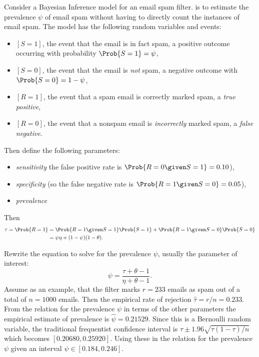 \documentclass[12pt]{article}
\begin{document}
Consider a Bayesian Inference model for an email spam filter.%
is to estimate the prevalence \( \psi \) of email spam without having to
directly count the instances of email spam.  The model has the following
random variables and events:
\begin{itemize}
    \item
        \( [S=1] \), the event that the email is in fact spam, a
        positive outcome occurring with probability \( \Prob{S=1} = \psi
        \),
    \item
        \( [S=0] \), the event that the email is \emph{not} spam, a
        negative outcome with \( \Prob{S = 0} = 1 - \psi \),
    \item
        \( [R=1] \), the event that a spam email is correctly marked
        spam, a \emph{true positive},
    \item
        \( [R=0] \), the event that a nonspam email is \emph{incorrectly}
        marked spam, a \emph{false negative}.
\end{itemize}
Then define the following parameters:
\begin{itemize}
    \item
        \emph{sensitivity}%
        the false positive rate is \( \Prob{R = 0 \given S =1} = 0.10 \)),
    \item
        \emph{specificity}%
        (so the false negative rate is \( \Prob{R = 1 \given S = 0} =
        0.05 \)),
    \item
        \emph{prevalence}%
\end{itemize}
Then
\begin{align*}
    \tau = \Prob{R = 1} &= \Prob{R = 1 \given S =1} \Prob{S = 1} + \Prob
    {R = 1 \given S =0} \Prob{S = 0} \\
    &= \psi \eta + (1 - \psi)(1-\theta).
\end{align*}

Rewrite the equation to solve for the prevalence \( \psi \), usually the
parameter of interest:
\[
    \psi = \frac{\tau + \theta - 1}{\eta + \theta -1}.
\] Assume as an example, that the filter marks \( r = 233 \) emails as
spam out of a total of \( n = 1000 \) emails.  Then the empirical rate
of rejection \( \hat{\tau} = r/n = 0.233 \).  From the relation for the
prevalence \( \psi \) in terms of the other parameters the empirical
estimate of prevalence is \( \hat{\psi} = 0.21529 \).  Since this is a
Bernoulli random variable, the traditional frequentist confidence
interval is \( \tau \pm 1.96 \sqrt{\tau (1-\tau)/n} \) which becomes \(
[0.20680, 0.25920] \).  Using these in the relation for the prevalence \(
\psi \) given an interval \( \psi \in [0.184, 0.246] \).
\end{document}
